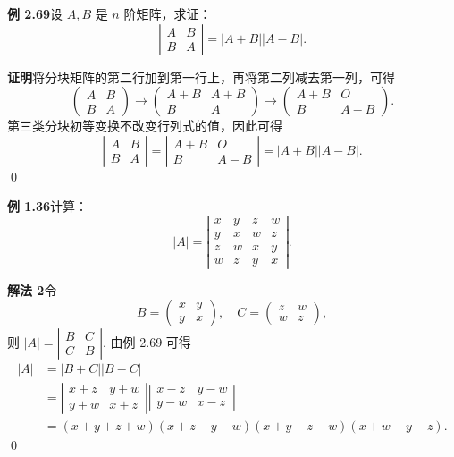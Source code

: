 \documentclass[UTF8,12pt,a4paper,fontset=fandol]{ctexart}
\begin{document}
\noindent\textbf{例 2.69}\quad 设 $A,B$ 是 $n$ 阶矩阵，求证：
\[
\left|
\begin{array}{cc}
A & B\\
B & A
\end{array}
\right|
=|A+B||A-B|.
\]

\noindent\textbf{证明}\quad 将分块矩阵的第二行加到第一行上，再将第二列减去第一列，可得
\[
\left(
\begin{array}{cc}
A & B\\
B & A
\end{array}
\right)
\to
\left(
\begin{array}{cc}
A+B & A+B\\
B & A
\end{array}
\right)
\to
\left(
\begin{array}{cc}
A+B & O\\
B & A-B
\end{array}
\right).
\]
第三类分块初等变换不改变行列式的值，因此可得
\[
\left|
\begin{array}{cc}
A & B\\
B & A
\end{array}
\right|
=
\left|
\begin{array}{cc}
A+B & O\\
B & A-B
\end{array}
\right|
=|A+B||A-B|.
\]
\qed

\noindent\textbf{例 1.36}\quad 计算：
\[
|A|=
\left|
\begin{array}{cccc}
x & y & z & w\\
y & x & w & z\\
z & w & x & y\\
w & z & y & x
\end{array}
\right|.
\]

\noindent\textbf{解法 2}\quad 令
\[
B=
\left(
\begin{array}{cc}
x & y\\
y & x
\end{array}
\right),\quad
C=
\left(
\begin{array}{cc}
z & w\\
w & z
\end{array}
\right),
\]
则 $|A|=
\left|
\begin{array}{cc}
B & C\\
C & B
\end{array}
\right|$. 由例 2.69 可得
\[
\begin{aligned}
|A|
&=|B+C||B-C|\\
&=
\left|
\begin{array}{cc}
x+z & y+w\\
y+w & x+z
\end{array}
\right|
\left|
\begin{array}{cc}
x-z & y-w\\
y-w & x-z
\end{array}
\right|\\
&=(x+y+z+w)(x+z-y-w)(x+y-z-w)(x+w-y-z).
\end{aligned}
\]
\qed
\end{document}
